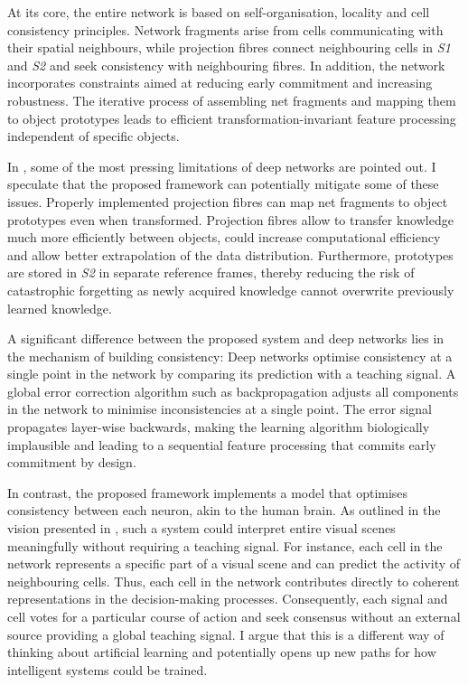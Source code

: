 At its core, the entire network is based on self-organisation, locality and cell consistency principles.
Network fragments arise from cells communicating with their spatial neighbours, while projection fibres connect neighbouring cells in \emph{S1} and \emph{S2} and seek consistency with neighbouring fibres.
In addition, the network incorporates constraints aimed at reducing early commitment and increasing robustness. The iterative process of assembling net fragments and mapping them to object prototypes leads to efficient transformation-invariant feature processing independent of specific objects.

In , some of the most pressing limitations of deep networks are pointed out.
I speculate that the proposed framework can potentially mitigate some of these issues. Properly implemented projection fibres can map net fragments to object prototypes even when transformed. Projection fibres allow to transfer knowledge  much more efficiently between objects, could increase computational efficiency and allow better extrapolation of the data distribution. Furthermore, prototypes are stored in \emph{S2} in separate reference frames, thereby reducing the risk of catastrophic forgetting  as newly acquired knowledge cannot overwrite previously learned knowledge.

A significant difference between the proposed system and deep networks lies in the mechanism of building consistency:
Deep networks optimise consistency at a single point in the network by comparing its prediction with a teaching signal.
A global error correction algorithm such as backpropagation adjusts all components in the network to minimise inconsistencies at a single point.
The error signal propagates layer-wise backwards, making the learning algorithm biologically implausible and leading to a sequential feature processing that commits early commitment  by design.

In contrast, the proposed framework implements a model that optimises consistency between each neuron, akin to the human brain.
As outlined in the vision presented in , such a system could interpret entire visual scenes meaningfully without requiring a teaching signal.
For instance, each cell in the network represents a specific part of a visual scene and can predict the activity of neighbouring cells.
Thus, each cell in the network contributes directly to coherent representations in the decision-making processes. Consequently, each signal and cell votes for a particular course of action and seek consensus without an external source providing a global teaching signal.
I argue that this is a different way of thinking about artificial learning and potentially opens up new paths for how intelligent systems could be trained.


